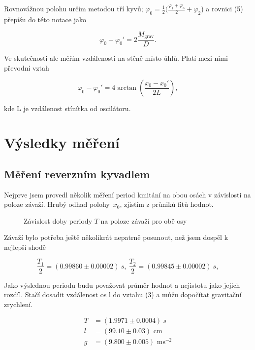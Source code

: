 \documentclass[a4paper,11pt]{article}
\begin{document}
\newpage

Rovnovážnou polohu určím metodou tří kyvů; $\varphi_0 = \frac{1}{2}(\frac{\varphi_1 + \varphi_3}{2} + \varphi_2$) a rovnici (5) přepíšu do této notace jako

\begin{equation}
\varphi_0 - \varphi_0' = 2 \frac{M_{\text{grav}}}{D}.
\end{equation}

Ve skutečnosti ale měřím vzdálenosti na stěně místo úhlů. Platí mezi nimi převodní vztah

\begin{equation}
\varphi_0 - \varphi_0' = 4\arctan(\frac{x_0 - x_0'}{2L}),
\end{equation}

\noindent
kde L je vzdálenost stínítka od oscilátoru.

\section{Výsledky měření}

\subsection{Měření reverzním kyvadlem}
Nejprve jsem provedl několik měření period kmitání na obou osách v závislosti na poloze závaží. Hrubý odhad polohy~$x_0$, zjistím z průniků fitů hodnot.

\begin{figure}[htpb]
  \centering
  
  \caption{Závislost doby periody $T$ na poloze závaží pro obě osy}
\end{figure}

Závaží bylo potřeba ještě několikrát nepatrně posunout, než jsem dospěl k nejlepší shodě

\begin{equation}
\frac{T_1}{2} = (0.99860 \pm 0.00002)\ s,\ \frac{T_2}{2} = (0.99845 \pm 0.00002)\ s,
\end{equation}

Jako výslednou periodu budu považovat průměr hodnot a nejistotu jako jejich rozdíl. Stačí dosadit vzdálenost os l do vztahu (3) a můžu dopočítat gravitační zrychlení. 

\begin{align}
  T &= (1.9971 \pm 0.0004) \ s \\
  l &= (99.10 \pm 0.03) \text{ cm} \\
  g &= (9.800 \pm 0.005) \text{ ms}^{-2}
\end{align}
\end{document}
